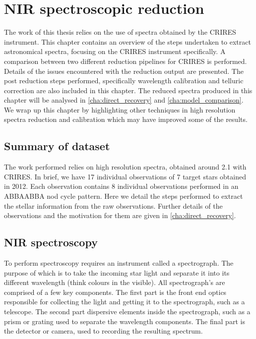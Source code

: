 
\chapter{NIR spectroscopic reduction} %
\label{cha:reduction}
The work of this thesis relies on the use of \nir{} spectra obtained by the {CRIRES} instrument. This chapter contains an overview of the steps undertaken to extract astronomical spectra, focusing on the {CRIRES} instrument specifically. A comparison between two different reduction pipelines for {CRIRES} is performed. Details of the issues encountered with the reduction output are presented. The post reduction steps performed, specifically wavelength calibration and telluric correction are also included in this chapter. The reduced spectra produced in this chapter will be analysed in \cref{cha:direct_recovery} and \cref{cha:model_comparison}. We wrap up this chapter by highlighting other techniques in high resolution \nir{} spectra reduction and calibration which may have improved some of the results.

\section{Summary of dataset}
\todo{}{}
The work performed relies on high resolution \nir{} spectra, obtained around 2.1\um{} with {CRIRES}. In brief, we have 17 individual observations of 7 target stars obtained in 2012. Each observation contains 8 individual observations performed in an {ABBAABBA} nod cycle pattern. Here we detail the steps performed to extract the stellar information from the raw observations. Further details of the observations and the motivation for them are given in \cref{cha:direct_recovery}.


\section{NIR spectroscopy}
To perform spectroscopy requires an instrument called a spectrograph. The purpose of which is to take the incoming star light and separate it into its different wavelength (think colours in the visible). All spectrograph's are comprised of a few key components. The first part is the front end optics responsible for collecting the light and getting it to the spectrograph, such as a telescope. The second part dispersive elements inside the spectrograph, such as a prism or grating used to separate the wavelength components. The final part is the detector or camera, used to recording the resulting spectrum.

